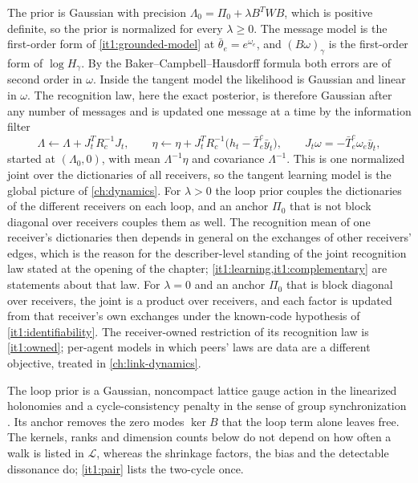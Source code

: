 The prior is Gaussian with precision $\Lambda_0=\Pi_0+\lambda B^TWB$, which is positive definite, so the prior is normalized for every $\lambda\geq0$. The message model is the first-order form of \cref{it1:grounded-model} at $\bar\theta_e=e^{\omega_e}$, and $(B\omega)_\gamma$ is the first-order form of $\log H_\gamma$. By the Baker--Campbell--Hausdorff formula both errors are of second order in $\omega$. Inside the tangent model the likelihood is Gaussian and linear in $\omega$. The recognition law, here the exact posterior, is therefore Gaussian after any number of messages and is updated one message at a time by the information filter
\begin{equation}
\Lambda\leftarrow\Lambda+J_t^TR_c^{-1}J_t,\qquad
\eta\leftarrow\eta+J_t^TR_c^{-1}\bigl(h_t-\bar T_e^c\bar y_t\bigr),\qquad
J_t\omega=-\bar T_e^c\omega_e\bar y_t,
\label{it1:information-filter}
\end{equation}
started at $(\Lambda_0,0)$, with mean $\Lambda^{-1}\eta$ and covariance $\Lambda^{-1}$. This is one normalized joint over the dictionaries of all receivers, so the tangent learning model is the global picture of \cref{ch:dynamics}. For $\lambda>0$ the loop prior couples the dictionaries of the different receivers on each loop, and an anchor $\Pi_0$ that is not block diagonal over receivers couples them as well. The recognition mean of one receiver's dictionaries then depends in general on the exchanges of other receivers' edges, which is the reason for the describer-level standing of the joint recognition law stated at the opening of the chapter; \cref{it1:learning,it1:complementary} are statements about that law. For $\lambda=0$ and an anchor $\Pi_0$ that is block diagonal over receivers, the joint is a product over receivers, and each factor is updated from that receiver's own exchanges under the known-code hypothesis of \cref{it1:identifiability}. The receiver-owned restriction of its recognition law is \cref{it1:owned}; per-agent models in which peers' laws are data are a different objective, treated in \cref{ch:link-dynamics}.

The loop prior is a Gaussian, noncompact lattice gauge action in the linearized holonomies \citep{Wilson1974} and a cycle-consistency penalty in the sense of group synchronization \citep{GaoBrodzkiMukherjee2021}. Its anchor removes the zero modes $\ker B$ that the loop term alone leaves free. The kernels, ranks and dimension counts below do not depend on how often a walk is listed in $\mathcal L$, whereas the shrinkage factors, the bias and the detectable dissonance do; \cref{it1:pair} lists the two-cycle once.

